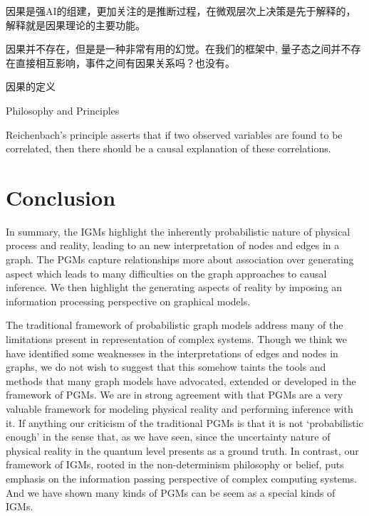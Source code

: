 \documentclass{article}
\theoremstyle{definition}
\theoremstyle{remark}
\theoremstyle{definition}
\begin{document}
\begin{CJK*}{UTF8}{gbsn}
因果是强AI的组建，更加关注的是推断过程，在微观层次上决策是先于解释的，解释就是因果理论的主要功能。


因果并不存在，但是是一种非常有用的幻觉。在我们的框架中, 量子态之间并不存在直接相互影响，事件之间有因果关系吗？也没有。

因果的定义

{Philosophy and Principles}

Reichenbach's principle asserts that if two observed variables are found to be correlated, then there should be a causal explanation of these correlations. 


\section{Conclusion}

In summary, the IGMs highlight the inherently probabilistic nature of physical process and reality, leading to an new interpretation of nodes and edges in a graph. The PGMs capture relationships more about association over generating aspect which leads to many difficulties on the graph approaches to causal inference. We then highlight the generating aspects of reality by imposing an information processing perspective on graphical models.


The traditional framework of probabilistic graph models address many of the limitations present in representation of complex systems. Though we think we have identified some weaknesses in the interpretations of edges and nodes in graphs, we do not wish to suggest that this somehow taints the tools and methods that many graph models have advocated, extended or developed in the framework of PGMs. We are in strong agreement with that PGMs are a very valuable framework for modeling physical reality and performing inference with it. If anything our criticism of the traditional PGMs is that it is not ‘probabilistic enough’ in the sense that, as we have seen, since the uncertainty nature of physical reality in the quantum level presents as a ground truth. In contrast, our framework of IGMs, rooted in the non-determinism philosophy or belief, puts emphasis on the information passing perspective of complex computing systems. And we have shown many kinds of PGMs can be seem as a special kinds of IGMs.




{\small


}

\end{CJK*}
\end{document}
